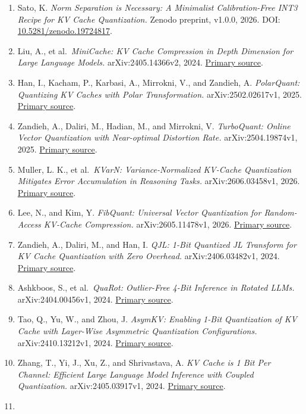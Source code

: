 \documentclass[10pt,a4paper]{article}
\begin{document}
\begin{enumerate}
\item
  Sato, K. \emph{Norm Separation is Necessary: A Minimalist Calibration-Free INT3 Recipe for KV Cache Quantization.} Zenodo preprint, v1.0.0, 2026. DOI: \href{https://doi.org/10.5281/zenodo.19724817}{10.5281/zenodo.19724817}.
\item
  Liu, A., et al.~\emph{MiniCache: KV Cache Compression in Depth Dimension for Large Language Models.} arXiv:2405.14366v2, 2024. \href{https://arxiv.org/html/2405.14366v2}{Primary source}.
\item
  Han, I., Kacham, P., Karbasi, A., Mirrokni, V., and Zandieh, A. \emph{PolarQuant: Quantizing KV Caches with Polar Transformation.} arXiv:2502.02617v1, 2025. \href{https://arxiv.org/html/2502.02617v1}{Primary source}.
\item
  Zandieh, A., Daliri, M., Hadian, M., and Mirrokni, V. \emph{TurboQuant: Online Vector Quantization with Near-optimal Distortion Rate.} arXiv:2504.19874v1, 2025. \href{https://arxiv.org/html/2504.19874v1}{Primary source}.
\item
  Muller, L. K., et al.~\emph{KVarN: Variance-Normalized KV-Cache Quantization Mitigates Error Accumulation in Reasoning Tasks.} arXiv:2606.03458v1, 2026. \href{https://arxiv.org/html/2606.03458v1}{Primary source}.
\item
  Lee, N., and Kim, Y. \emph{FibQuant: Universal Vector Quantization for Random-Access KV-Cache Compression.} arXiv:2605.11478v1, 2026. \href{https://arxiv.org/html/2605.11478v1}{Primary source}.
\item
  Zandieh, A., Daliri, M., and Han, I. \emph{QJL: 1-Bit Quantized JL Transform for KV Cache Quantization with Zero Overhead.} arXiv:2406.03482v1, 2024. \href{https://arxiv.org/html/2406.03482v1}{Primary source}.
\item
  Ashkboos, S., et al.~\emph{QuaRot: Outlier-Free 4-Bit Inference in Rotated LLMs.} arXiv:2404.00456v1, 2024. \href{https://arxiv.org/html/2404.00456v1}{Primary source}.
\item
  Tao, Q., Yu, W., and Zhou, J. \emph{AsymKV: Enabling 1-Bit Quantization of KV Cache with Layer-Wise Asymmetric Quantization Configurations.} arXiv:2410.13212v1, 2024. \href{https://arxiv.org/html/2410.13212v1}{Primary source}.
\item
  Zhang, T., Yi, J., Xu, Z., and Shrivastava, A. \emph{KV Cache is 1 Bit Per Channel: Efficient Large Language Model Inference with Coupled Quantization.} arXiv:2405.03917v1, 2024. \href{https://arxiv.org/html/2405.03917v1}{Primary source}.
\item

\end{enumerate}
\end{document}
